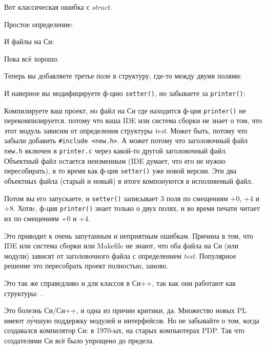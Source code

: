
Вот классическая ошибка с \emph{struct}.

Простое определение:



И файлы на Си:





Пока всё хорошо.

Теперь вы добавляете третье поле в структуру, где-то между двумя полями:



И наверное вы модифицируете ф-цию \verb|setter()|, но забываете за \verb|printer()|:



Компилируете ваш проект, но файл на Си где находится ф-ция \verb|printer()| не перекомпилируется.
потому что ваша \ac{IDE} или система сборки не знает о том, что этот модуль зависим от определения структуры \emph{test}.
Может быть, потому что забыли добавить \verb|#include <new.h>|.
А может потому что заголовочный файл \verb|new.h| включен в \verb|printer.c| через какой-то другой заголовочный файл.
Объектный файл остается неизменным (\ac{IDE} думает, что его не нужно пересобирать),
в то время как ф-ция \verb|setter()| уже новой версии.
Эти два объектных файла (старый и новый) в итоге компонуются в исполняемый файл.

Потом вы его запускаете, и \verb|setter()| записывает 3 поля по смещениям +0, +4 и +8.
Хотяr, ф-ция \verb|printer()| знает только о двух полях, и во время печати читает их по смещениям +0 и +4.

Это приводит к очень запутанным и неприятным ошибкам.
Причина в том, что \ac{IDE} или система сборки или Makefile не знают, что оба файла на Си (или модули) зависят от заголовочного
файла с определением \emph{test}.
Популярное решение это пересобрать проект полностью, заново.

Это так же справедливо и для классов в Си++, так как они работают как структуры: .

Это болезнь Си/Си++, и одна из причин критики, да.
Множество новых \ac{PL} имеют л\'{у}чшую поддержку модулей и интерфейсов.
Но не забывайте о том, когда создавался компилятор Си: в 1970-ых, на старых компьютерах PDP.
Так что создателями Си всё было упрощено до предела.

